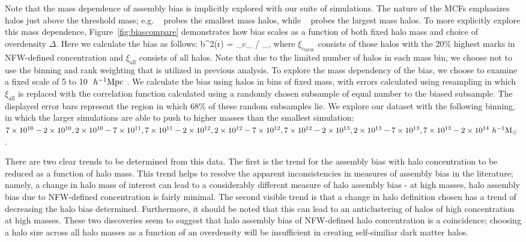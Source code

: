 \documentclass[usenatbib,fleqn]{mnras}
\begin{document}
Note that the mass dependence of assembly bias is implicitly explored with our suite of simulations.
The nature of the MCFs emphasizes halos just above the threshold mass; e.g. \simA~ probes the smallest mass
halos, while \simB~ probes the largest mass halos. To more explicitly explore this mass dependence, Figure~\ref{fig:biascompare}
demonstrates how bias scales as a function of both fixed halo mass and choice of overdensity $\Delta$. Here we calculate the bias as follows:
\beq
b^2(r) = \xi_{c_} / \xi_{},
\eeq
where $\xi_{c_\mathrm{NFW}}$ consists of those halos with the 20\% highest marks in NFW-defined concentration
and $\xi_{\mathrm{all}}$ consists of all halos. Note that due to the limited number of halos in each mass bin, we choose not to use the binning and rank weighting that is utilized in previous analysis.  To explore the mass dependency of the bias, we choose to
examine a fixed scale of 5 to 10 $\ h^{-1}\mathrm{Mpc}~$. We calculate the bias using halos in bins of fixed mass, with errors
calculated using resampling in which $\xi_{\mathrm{all}}$ is replaced with the correlation function calculated
using a randomly chosen subsample of equal number to the biased subsample. The displayed error bars represent
the region in which 68\% of these random subsamples lie. We explore our dataset with the following binning,
in which the larger simulations are able to push to higher masses than the smallest simulation:
$7\times10^{10}-2\times10^{10}, 2\times10^{10}-7\times10^{11},7\times10^{11}-2\times10^{12},
2\times10^{12}-7\times10^{12},7\times10^{12}-2\times10^{13},2\times10^{13}-7\times10^{13},
7\times10^{13}-2\times10^{14} \ h^{-1}\mathrm{M}_{\odot}~$.

There are two clear trends to be determined from this data. The first is the trend for the assembly bias with
halo concentration to be reduced as a function of halo mass. This trend helps to resolve the apparent
inconsistencies in measures of assembly bias in the literature; namely, a change in halo mass of
interest can lead to a considerably different measure of halo assembly bias - at high masses, halo assembly
bias due to NFW-defined concentration is fairly minimal. The second visible trend is that a change in halo
definition chosen has a trend of decreasing the halo bias determined. Furthermore, it should be noted that this
can lead to an anticlustering of halos of high concentration at high masses. These two discoveries seem to
suggest that halo assembly bias of NFW-defined halo concentration is a coincidence; choosing a halo size
across all halo masses as a function of an overdensity will be insufficient in creating self-similiar dark
matter halos.
\end{document}
